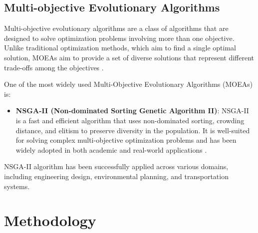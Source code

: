 \documentclass[12pt]{report}
\begin{document}
\section{Multi-objective Evolutionary Algorithms}
Multi-objective evolutionary algorithms are a class of algorithms that are designed to solve optimization problems involving more than one objective. Unlike traditional optimization methods, which aim to find a single optimal solution, MOEAs aim to provide a set of diverse solutions that represent different trade-offs among the objectives \cite{ref5}.

One of the most widely used Multi-Objective Evolutionary Algorithms (MOEAs) is:

\begin{itemize}
    \item \textbf{NSGA-II (Non-dominated Sorting Genetic Algorithm II)}: NSGA-II is a fast and efficient algorithm that uses non-dominated sorting, crowding distance, and elitism to preserve diversity in the population. It is well-suited for solving complex multi-objective optimization problems and has been widely adopted in both academic and real-world applications \cite{ref6}.
\end{itemize}

NSGA-II algorithm has been successfully applied across various domains, including engineering design, environmental planning, and transportation systems.


\chapter{Methodology}
\end{document}
